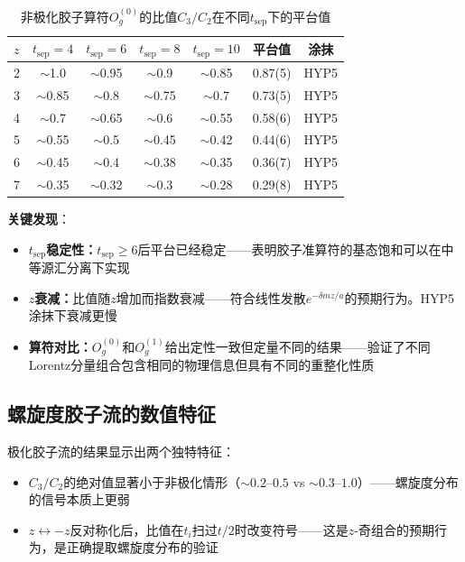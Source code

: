 \documentclass[12pt,a4paper]{ctexart}
\theoremstyle{definition}
\begin{document}
\begin{table}[H]
\centering
\caption{非极化胶子算符$O^{(0)}_g$的比值$C_3/C_2$在不同$t_{\text{sep}}$下的平台值\cite{NoteGluonPDFs}}
\label{fig:ratio_results}
\begin{tabular}{lcccccc}
\toprule
$z$ & $t_{\text{sep}}=4$ & $t_{\text{sep}}=6$ & $t_{\text{sep}}=8$ & $t_{\text{sep}}=10$ & 平台值 & 涂抹 \\
\midrule
2 & $\sim$1.0 & $\sim$0.95 & $\sim$0.9 & $\sim$0.85 & 0.87(5) & HYP5 \\
3 & $\sim$0.85 & $\sim$0.8 & $\sim$0.75 & $\sim$0.7 & 0.73(5) & HYP5 \\
4 & $\sim$0.7 & $\sim$0.65 & $\sim$0.6 & $\sim$0.55 & 0.58(6) & HYP5 \\
5 & $\sim$0.55 & $\sim$0.5 & $\sim$0.45 & $\sim$0.42 & 0.44(6) & HYP5 \\
6 & $\sim$0.45 & $\sim$0.4 & $\sim$0.38 & $\sim$0.35 & 0.36(7) & HYP5 \\
7 & $\sim$0.35 & $\sim$0.32 & $\sim$0.3 & $\sim$0.28 & 0.29(8) & HYP5 \\
\bottomrule
\end{tabular}
\end{table}

\textbf{关键发现}\cite{NoteGluonPDFs}：
\begin{itemize}
    \item \textbf{$t_{\text{sep}}$稳定性：}$t_{\text{sep}}\ge 6$后平台已经稳定——表明胶子准算符的基态饱和可以在中等源汇分离下实现
    \item \textbf{$z$衰减：}比值随$z$增加而指数衰减——符合线性发散$e^{-\delta m z/a}$的预期行为。HYP5涂抹下衰减更慢
    \item \textbf{算符对比：}$O^{(0)}_g$和$O^{(1)}_g$给出定性一致但定量不同的结果——验证了不同Lorentz分量组合包含相同的物理信息但具有不同的重整化性质
\end{itemize}

\subsection{螺旋度胶子流的数值特征}

极化胶子流的结果\cite{NoteGluonPDFs}显示出两个独特特征：
\begin{itemize}
    \item $C_3/C_2$的绝对值显著小于非极化情形（$\sim0.2$--$0.5$ vs $\sim0.3$--$1.0$）——螺旋度分布的信号本质上更弱
    \item $z\leftrightarrow -z$反对称化后，比值在$t_i$扫过$t/2$时改变符号——这是$z$-奇组合的预期行为，是正确提取螺旋度分布的验证
\end{itemize}
\end{document}
